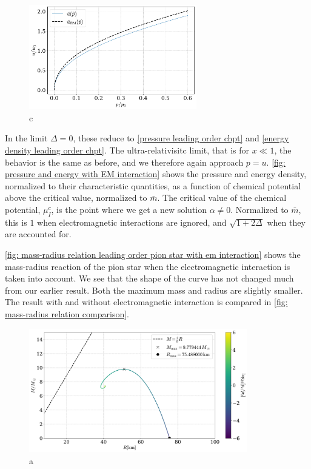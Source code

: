 \begin{figure}[!htb]
    \centering
    \includegraphics[width=0.65\textwidth]{../scripts/figurer/pion_star/pion_eos_EM.pdf}
    \caption{c}
    \label{fig: eos chpt em interaction}
\end{figure}

In the limit $\Delta = 0$, these reduce to \autoref{pressure leading order chpt} and \autoref{energy density leading order chpt}.
The ultra-relativisitc limit, that is for  $x \ll 1$, the behavior is the same as before, and we therefore again approach $p = u$.
\autoref{fig: pressure and energy with EM interaction} shows the pressure and energy density, normalized to their characteristic quantities, as a function of chemical potential above the critical value, normalized to $\bar m$.
The critical value of the chemical potential, $\mu_I^c$, is the point where we get a new solution $\alpha\neq 0$.
Normalized to $\bar m$, this is $1$ when electromagnetic interactions are ignored, and $\sqrt{1 + 2 \Delta}$ when they are accounted for.



\autoref{fig: mass-radius relation leading order pion star with em interaction} shows the mass-radius reaction of the pion star when the electromagnetic interaction is taken into account.
We see that the shape of the curve has not changed much from our earlier result. 
Both the maximum mass and radius are slightly smaller.
The result with and without electromagnetic interaction is compared in \autoref{fig: mass-radius relation comparison}.


\begin{figure}[!htb]
    \centering
    \includegraphics[width=0.85\textwidth]{../scripts/figurer/pion_star/mass_radius_pion_star_EM.pdf}
    \caption{a }
    \label{fig: mass-radius relation leading order pion star with em interaction}
\end{figure}


